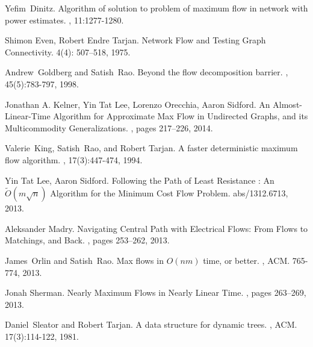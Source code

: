 \documentclass[11pt]{article}
\begin{document}
\begin{thebibliography}{42}

Yefim~Dinitz.
\newblock Algorithm of solution to problem of maximum flow in network with power estimates. 
, 11:1277-1280.

Shimon Even, Robert Endre Tarjan.
\newblock Network Flow and Testing Graph Connectivity.
 4(4): 507--518, 1975.

Andrew~Goldberg and Satish~Rao. 
\newblock Beyond the flow decomposition barrier.
, 45(5):783-797, 1998.

Jonathan A. Kelner, Yin Tat Lee, Lorenzo Orecchia, Aaron Sidford.
\newblock An Almost-Linear-Time Algorithm for Approximate Max Flow in Undirected Graphs, and its Multicommodity Generalizations. 
, pages 217--226, 2014.

Valerie~King, Satish~Rao, and Robert Tarjan.
\newblock A faster deterministic maximum flow algorithm.
, 17(3):447-474, 1994.

Yin Tat Lee, Aaron Sidford.
\newblock Following the Path of Least Resistance : An $\tilde{O}(m\sqrt{n})$ Algorithm for the Minimum Cost Flow Problem.
 abs/1312.6713, 2013.

Aleksander Madry.
\newblock Navigating Central Path with Electrical Flows: From Flows to Matchings, and Back. 
, pages 253--262, 2013.

James~Orlin and Satish~Rao. 
\newblock Max flows in $O(nm)$ time, or better. 
, ACM. 765-774, 2013.

Jonah Sherman.
\newblock Nearly Maximum Flows in Nearly Linear Time.
, pages 263--269, 2013.

Daniel~Sleator and Robert Tarjan.
\newblock A data structure for dynamic trees.
, ACM. 17(3):114-122, 1981.

\end{thebibliography}
\end{document}
